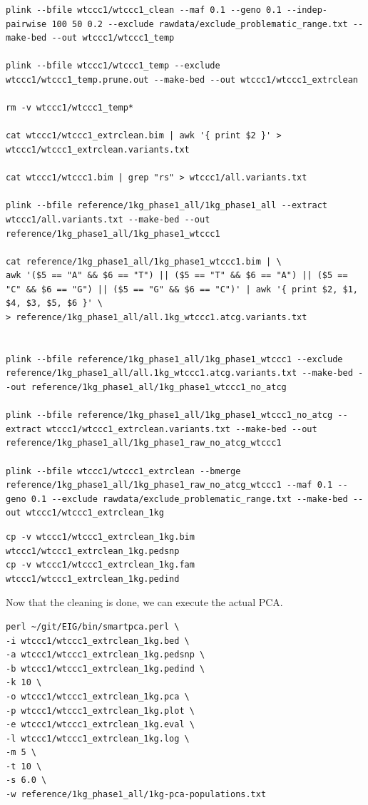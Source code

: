 \documentclass[
]{book}
\begin{document}
\begin{verbatim}
plink --bfile wtccc1/wtccc1_clean --maf 0.1 --geno 0.1 --indep-pairwise 100 50 0.2 --exclude rawdata/exclude_problematic_range.txt --make-bed --out wtccc1/wtccc1_temp

plink --bfile wtccc1/wtccc1_temp --exclude wtccc1/wtccc1_temp.prune.out --make-bed --out wtccc1/wtccc1_extrclean

rm -v wtccc1/wtccc1_temp*

cat wtccc1/wtccc1_extrclean.bim | awk '{ print $2 }' > wtccc1/wtccc1_extrclean.variants.txt

cat wtccc1/wtccc1.bim | grep "rs" > wtccc1/all.variants.txt

plink --bfile reference/1kg_phase1_all/1kg_phase1_all --extract wtccc1/all.variants.txt --make-bed --out reference/1kg_phase1_all/1kg_phase1_wtccc1

cat reference/1kg_phase1_all/1kg_phase1_wtccc1.bim | \
awk '($5 == "A" && $6 == "T") || ($5 == "T" && $6 == "A") || ($5 == "C" && $6 == "G") || ($5 == "G" && $6 == "C")' | awk '{ print $2, $1, $4, $3, $5, $6 }' \
> reference/1kg_phase1_all/all.1kg_wtccc1.atcg.variants.txt


plink --bfile reference/1kg_phase1_all/1kg_phase1_wtccc1 --exclude reference/1kg_phase1_all/all.1kg_wtccc1.atcg.variants.txt --make-bed --out reference/1kg_phase1_all/1kg_phase1_wtccc1_no_atcg

plink --bfile reference/1kg_phase1_all/1kg_phase1_wtccc1_no_atcg --extract wtccc1/wtccc1_extrclean.variants.txt --make-bed --out reference/1kg_phase1_all/1kg_phase1_raw_no_atcg_wtccc1

plink --bfile wtccc1/wtccc1_extrclean --bmerge reference/1kg_phase1_all/1kg_phase1_raw_no_atcg_wtccc1 --maf 0.1 --geno 0.1 --exclude rawdata/exclude_problematic_range.txt --make-bed --out wtccc1/wtccc1_extrclean_1kg
\end{verbatim}

\begin{verbatim}
cp -v wtccc1/wtccc1_extrclean_1kg.bim wtccc1/wtccc1_extrclean_1kg.pedsnp
cp -v wtccc1/wtccc1_extrclean_1kg.fam wtccc1/wtccc1_extrclean_1kg.pedind
\end{verbatim}

Now that the cleaning is done, we can execute the actual PCA.

\begin{verbatim}
perl ~/git/EIG/bin/smartpca.perl \
-i wtccc1/wtccc1_extrclean_1kg.bed \
-a wtccc1/wtccc1_extrclean_1kg.pedsnp \
-b wtccc1/wtccc1_extrclean_1kg.pedind \
-k 10 \
-o wtccc1/wtccc1_extrclean_1kg.pca \
-p wtccc1/wtccc1_extrclean_1kg.plot \
-e wtccc1/wtccc1_extrclean_1kg.eval \
-l wtccc1/wtccc1_extrclean_1kg.log \
-m 5 \
-t 10 \
-s 6.0 \
-w reference/1kg_phase1_all/1kg-pca-populations.txt
\end{verbatim}
\end{document}
